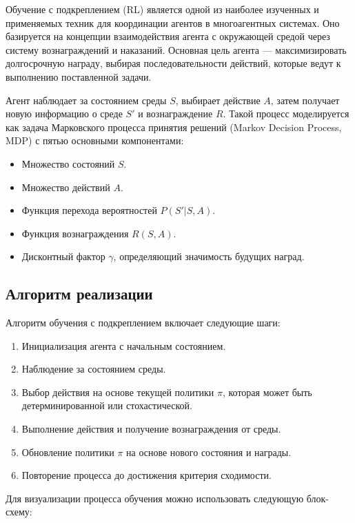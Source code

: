 Обучение с подкреплением (RL) является одной из наиболее изученных и применяемых техник для координации агентов в многоагентных системах. Оно базируется на концепции взаимодействия агента с окружающей средой через систему вознаграждений и наказаний. Основная цель агента — максимизировать долгосрочную награду, выбирая последовательности действий, которые ведут к выполнению поставленной задачи.

Агент наблюдает за состоянием среды \( S \), выбирает действие \( A \), затем получает новую информацию о среде \( S' \) и вознаграждение \( R \). Такой процесс моделируется как задача Марковского процесса принятия решений (Markov Decision Process, MDP) с пятью основными компонентами:
\begin{itemize}
	\item Множество состояний \( S \).
	\item Множество действий \( A \).
	\item Функция перехода вероятностей \( P(S'|S, A) \).
	\item Функция вознаграждения \( R(S, A) \).
	\item Дисконтный фактор \( \gamma \), определяющий значимость будущих наград.
\end{itemize}

\subsection{Алгоритм реализации}

Алгоритм обучения с подкреплением включает следующие шаги:
\begin{enumerate}
	\item Инициализация агента с начальным состоянием.
	\item Наблюдение за состоянием среды.
	\item Выбор действия на основе текущей политики \( \pi \), которая может быть детерминированной или стохастической.
	\item Выполнение действия и получение вознаграждения от среды.
	\item Обновление политики \( \pi \) на основе нового состояния и награды.
	\item Повторение процесса до достижения критерия сходимости.
\end{enumerate}

Для визуализации процесса обучения можно использовать следующую блок-схему:

\begin{center}
\end{center}

